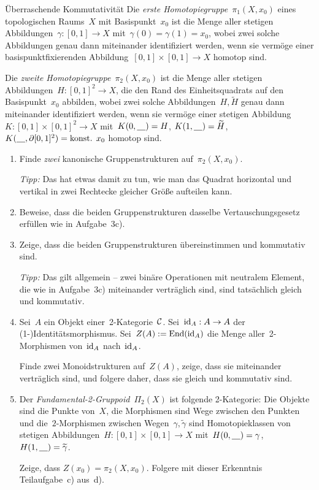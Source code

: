 \documentclass{uebblatt}
\begin{document}
\begin{aufgabe}{Überraschende Kommutativität}
Die \emph{erste Homotopiegruppe}~$\pi_1(X,x_0)$ eines topologischen Raums~$X$
mit Basispunkt~$x_0$ ist die Menge aller stetigen Abbildungen~$\gamma : [0,1]
\to X$ mit~$\gamma(0) = \gamma(1) = x_0$, wobei zwei solche Abbildungen genau
dann miteinander identifiziert werden, wenn sie vermöge einer
basispunktfixierenden Abbildung~$[0,1] \times [0,1] \to X$ homotop sind.

Die \emph{zweite Homotopiegruppe}~$\pi_2(X,x_0)$ ist
die Menge aller stetigen Abbildungen~$H : [0,1]^2 \to X$, die den Rand des
Einheitsquadrats auf den Basispunkt~$x_0$ abbilden, wobei zwei solche
Abbildungen~$H, \widetilde H$ genau dann miteinander identifiziert werden, wenn sie vermöge
einer stetigen Abbildung~$K : [0,1] \times [0,1]^2 \to X$
mit~$K(0,\underline{\quad}) = H$, $K(1,\underline{\quad}) = \widetilde H$,
$K(\underline{\quad},\partial [0,1]^2) = \text{konst. $x_0$}$ homotop
sind.

\begin{enumerate}
\item Finde \emph{zwei} kanonische Gruppenstrukturen auf~$\pi_2(X,x_0)$.

\emph{Tipp:} Das hat etwas damit zu tun, wie man das Quadrat horizontal und
vertikal in zwei Rechtecke gleicher Größe aufteilen kann.

\item Beweise, dass die beiden Gruppenstrukturen dasselbe Vertauschungsgesetz
erfüllen wie in Aufgabe~3c).
\item Zeige, dass die beiden Gruppenstrukturen übereinstimmen und kommutativ
sind.

\emph{Tipp:} Das gilt allgemein -- zwei binäre Operationen mit neutralem
Element, die wie in Aufgabe~3c) miteinander verträglich sind, sind tatsächlich
gleich und kommutativ.

\item Sei~$A$ ein Objekt einer~2-Kategorie~$\mathcal{C}$. Sei~$\mathrm{id}_A : A \to A$ der
(1-)Identitätsmorphismus. Sei~$Z(A) := \mathrm{End}(\mathrm{id}_A)$ die Menge
aller~2-Morphismen von~$\mathrm{id}_A$ nach~$\mathrm{id}_A$.

Finde zwei Monoidstrukturen auf~$Z(A)$, zeige, dass sie miteinander
verträglich sind, und folgere daher, dass sie gleich und kommutativ sind.

\item Der \emph{Fundamental-2-Gruppoid}~$\Pi_2(X)$ ist folgende 2-Kategorie:
Die Objekte sind die Punkte von~$X$, die Morphismen sind Wege zwischen den
Punkten und die~$2$-Morphismen zwischen Wegen~$\gamma, \widetilde\gamma$ sind
Homotopieklassen von stetigen Abbildungen~$H : [0,1] \times [0,1] \to X$
mit~$H(0,\underline{\quad}) = \gamma$, $H(1,\underline{\quad}) = \widetilde\gamma$.

Zeige, dass $Z(x_0) = \pi_2(X,x_0)$. Folgere mit dieser Erkenntnis
Teilaufgabe~c) aus~d).
\end{enumerate}
\end{aufgabe}
\end{document}
